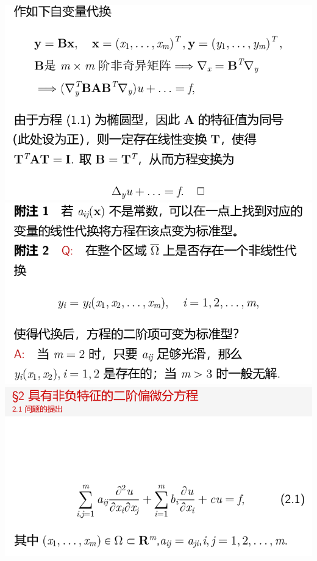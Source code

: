 \documentclass[11pt,a4paper]{ctexart}
\begin{document}
\begin{paracol}{2}
\includegraphics[width=\linewidth]{chap05_15.png}
\includegraphics[width=\linewidth]{chap05_16.png}
\includegraphics[width=\linewidth]{chap05_17.png}
\newpage


\end{paracol}
\end{document}
